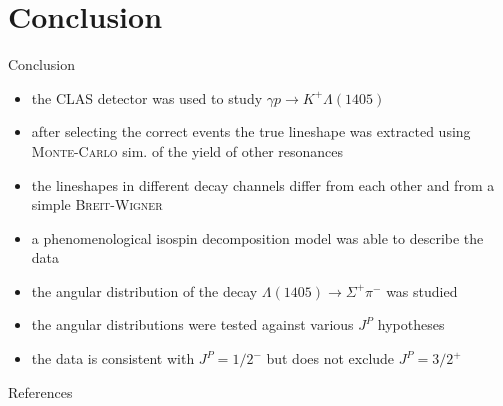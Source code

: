 \documentclass[11pt,aspectratio=1610,dvipsnames]{beamer}
\begin{document}
\section{Conclusion}
\begin{frame}{Conclusion}
\begin{minipage}{.49\linewidth}
	\begin{tcolorbox}[colback=black!10,colframe=gray!20!black,title=Lineshape measurement] 
	\begin{itemize}
		\item the CLAS detector was used to study $\gamma p \to K^+\Lambda(1405)$
		\item after selecting the correct events the true lineshape was extracted using \textsc{Monte-Carlo} sim. of the yield of other resonances
		\item the lineshapes in different decay channels differ from each other and from a simple \textsc{Breit-Wigner}
		\item a phenomenological isospin decomposition model was able to describe the data
	\end{itemize}

\end{tcolorbox}
\end{minipage}
\begin{minipage}{.49\linewidth}
	\begin{tcolorbox}[colback=black!10,colframe=gray!20!black,title=Spin parity measurement] 
		\begin{itemize}
			\item the angular distribution of the decay $\Lambda(1405)\to\Sigma^+\pi^-$ was studied
			\item the angular distributions were tested against various $J^P$ hypotheses
			\item the data is consistent with $J^P=1/2^-$ but does not exclude $J^P=3/2^+$
		\end{itemize}
		
	\end{tcolorbox}
\end{minipage}	
\end{frame}




\begin{frame}{References}
	\printbibliography
\end{frame}
\appendix
\end{document}
